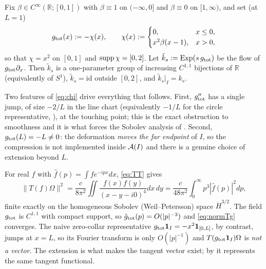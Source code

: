 \begin{definition}\label{def:ktilde}
Fix $\beta\in C^\infty(\mathbb R;[0,1])$ with $\beta\equiv1$ on $(-\infty,0]$ and $\beta\equiv0$ on
$[1,\infty)$, and set (at $L=1$)
\begin{equation}\label{eq:chi}
 g_{\rm tot}(x):=-\chi(x),\qquad
 \chi(x):=\begin{cases}0,&x\le0,\\ x^{2}\beta(x-1),&x>0,\end{cases}
\end{equation}
so that $\chi=x^{2}$ on $[0,1]$ and $\operatorname{supp}\chi=[0,2]$.  Let $\tilde k_s:=\mathrm{Exp}(s\,g_{\rm tot})$ be
the flow of $g_{\rm tot}\partial_x$.  Then $\tilde k_s$ is a one-parameter group of increasing $C^{1,1}$
bijections of $\mathbb R$ (equivalently of $S^1$), $\tilde k_s=\mathrm{id}$ outside $[0,2]$, and
$\tilde k_s|_I=k_s$.
\end{definition}

Two features of \eqref{eq:chi} drive everything that follows.  First, $g_{\rm tot}''$ has a single jump, of
size $-2/L$ in the line chart (equivalently $-1/L$ for the circle representative, ), at the
touching point; this is the exact obstruction to smoothness and it is what forces the
Sobolev analysis of .  Second, $g_{\rm tot}(L)=-L\neq0$: the deformation \emph{moves the far
endpoint} of $I$, so the compression is not implemented inside $\mathcal A(I)$ and there is a genuine choice of
extension beyond $L$.

\begin{remark}\label{rem:vector}
For real $f$ with $\hat f(p)=\int f e^{-ipx}dx$, \eqref{eq:TT} gives
\begin{equation}\label{eq:normTg}
 \|T(f)\Omega\|^{2}=\frac{c}{8\pi^{2}}\iint\frac{f(x)f(y)}{(x-y-i0)^{4}}dx\,dy
 =\frac{c}{48\pi^{2}}\int_{0}^{\infty}p^{3}|\hat f(p)|^{2}dp,
\end{equation}
finite exactly on the homogeneous Sobolev (Weil--Petersson) space $\dot H^{3/2}$.  The field $g_{\rm tot}$
is $C^{1,1}$ with compact support, so $\hat g_{\rm tot}(p)=O(|p|^{-3})$ and \eqref{eq:normTg} converges.
The naive zero-collar representative $g_{\rm tot}\mathbf 1_{I}=-x^{2}\mathbf 1_{[0,L]}$, by contrast, jumps
at $x=L$, so its Fourier transform is only $O(|p|^{-1})$ and $T(g_{\rm tot}\mathbf 1_I)\Omega$ is
\emph{not a vector}.  The extension is what makes the tangent vector exist; by  it
represents the same tangent functional.
\end{remark}

